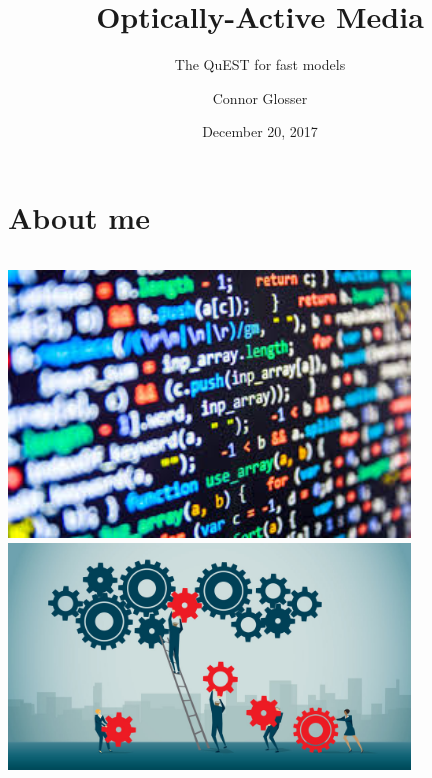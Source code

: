\documentclass[aspectratio=169]{beamer}
\title{Optically-Active Media}
\subtitle{The QuEST for fast models}
\date{December 20, 2017}
\author{Connor Glosser}
\institute{Michigan State University}
\begin{document}
\maketitle

\section{About me}

\begin{frame}
  \vspace{0.7cm}
  \begin{columns}[c]
      \hfill \includegraphics[width=0.8\textwidth]{figures/coding.jpg} \\ \vspace{0.6cm}
      \hfill \includegraphics[width=0.8\textwidth]{figures/collaboration.jpg}


\end{columns}
\end{frame}
\end{document}
